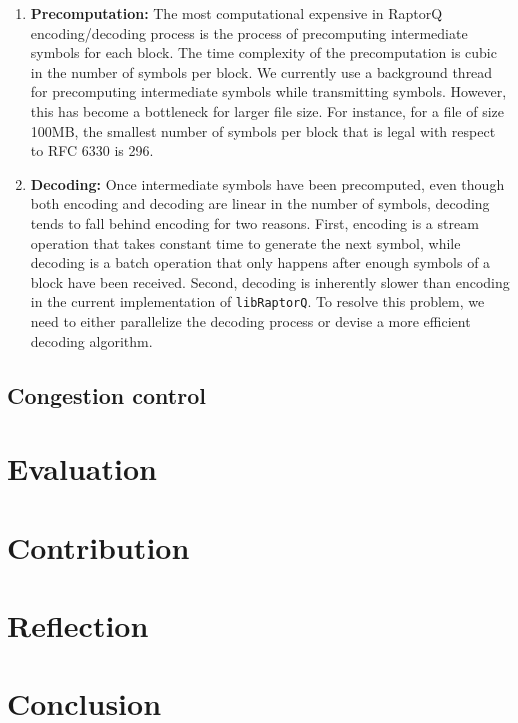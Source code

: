 \documentclass{sig-alternate-10pt}
\begin{document}
\begin{enumerate}[label=(\alph*)]
\item \textbf{Precomputation:} The most computational expensive in RaptorQ encoding/decoding process is the process of precomputing intermediate symbols for each block. The time complexity of the precomputation is cubic in the number of symbols per block. We currently use a background thread for precomputing intermediate symbols while transmitting symbols. However, this has become a bottleneck for larger file size. For instance, for a file of size 100MB, the smallest number of symbols per block that is legal with respect to RFC 6330 is 296.
\item \textbf{Decoding:} Once intermediate symbols have been precomputed, even though both encoding and decoding are linear in the number of symbols, decoding tends to fall behind encoding for two reasons. First, encoding is a stream operation that takes constant time to generate the next symbol, while decoding is a batch operation that only happens after enough symbols of a block have been received. Second, decoding is inherently slower than encoding in the current implementation of \texttt{libRaptorQ}. To resolve this problem, we need to either parallelize the decoding process or devise a more efficient decoding algorithm.
\end{enumerate}

\subsection{Congestion control}

\section{Evaluation}

\section{Contribution}

\section{Reflection}

\section{Conclusion}




\end{document}
